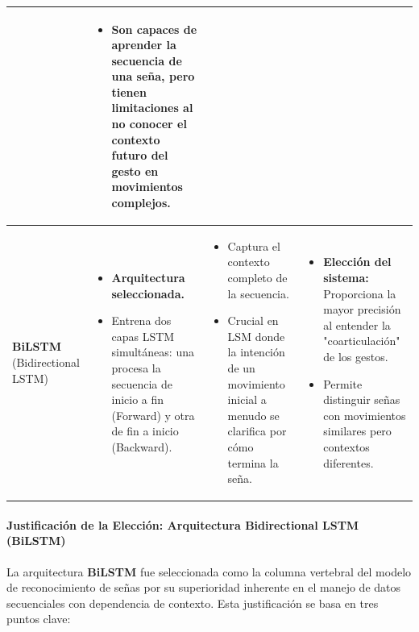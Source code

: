 \begin{table}[H]
\begin{tabular}{|p{2.5cm}|p{4.5cm}|p{4.5cm}|p{4.5cm}|}
\begin{itemize}
        \end{itemize} &
        \begin{itemize}
            \item Son capaces de aprender la secuencia de una seña, pero tienen limitaciones al no conocer el contexto futuro del gesto en movimientos complejos.
        \end{itemize} \\
        \hline
        \textbf{BiLSTM} \newline (Bidirectional LSTM) &
        \begin{itemize}
            \item \textbf{Arquitectura seleccionada.}
            \item Entrena dos capas LSTM simultáneas: una procesa la secuencia de inicio a fin (Forward) y otra de fin a inicio (Backward).
        \end{itemize} &
        \begin{itemize}
            \item Captura el contexto completo de la secuencia.
            \item Crucial en LSM donde la intención de un movimiento inicial a menudo se clarifica por cómo termina la seña.
        \end{itemize} &
        \begin{itemize}
            \item \textbf{Elección del sistema:} Proporciona la mayor precisión al entender la "coarticulación" de los gestos.
            \item Permite distinguir señas con movimientos similares pero contextos diferentes.
        \end{itemize} \\
        \hline
    \end{tabular}
\end{table}

\paragraph{Justificación de la Elección: Arquitectura Bidirectional LSTM (BiLSTM)}
La arquitectura \textbf{BiLSTM} fue seleccionada como la columna vertebral del modelo de reconocimiento de señas por su superioridad inherente en el manejo de datos secuenciales con dependencia de contexto. Esta justificación se basa en tres puntos clave:

